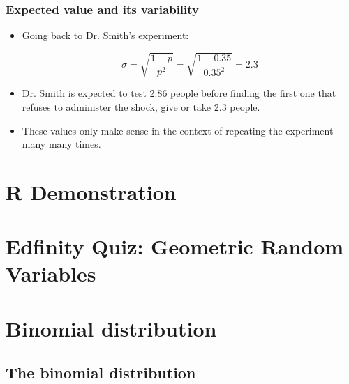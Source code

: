 \documentclass[slidestop,compress,mathserif]{beamer}
\begin{document}
\begin{frame}
\frametitle{Expected value and its variability}


\pause

\begin{itemize}

\item Going back to Dr. Smith's experiment:

\[ \sigma = \sqrt{\frac{1-p}{p^2}} = \sqrt{\frac{1-0.35}{0.35^2}} = 2.3 \]

\pause

\item Dr. Smith is expected to test 2.86 people before finding the first one that refuses to administer the shock, give or take 2.3 people.

\pause

\item These values only make sense in the context of repeating the experiment many many times.

\end{itemize}

\end{frame}


\section{R Demonstration}


\section{Edfinity Quiz: Geometric Random Variables}



\section{Binomial distribution}


\subsection{The binomial distribution}
\end{document}
